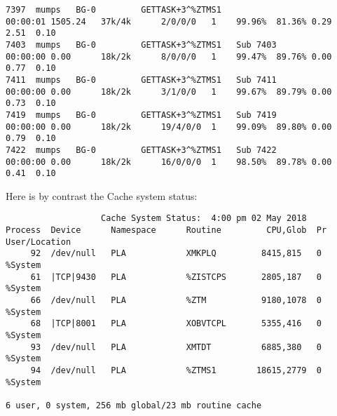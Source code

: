 \documentclass[]{article}
\begin{document}
\begin{landscape}
\begin{changemargin}{-0.25in}{-0.25in}
\begin{lstlisting}
7397  mumps   BG-0         GETTASK+3^%ZTMS1                       00:00:01 1505.24   37k/4k      2/0/0/0   1    99.96%  81.36% 0.29    2.51  0.10
7403  mumps   BG-0         GETTASK+3^%ZTMS1   Sub 7403            00:00:00 0.00      18k/2k      8/0/0/0   1    99.47%  89.76% 0.00    0.77  0.10
7411  mumps   BG-0         GETTASK+3^%ZTMS1   Sub 7411            00:00:00 0.00      18k/2k      3/1/0/0   1    99.67%  89.79% 0.00    0.73  0.10
7419  mumps   BG-0         GETTASK+3^%ZTMS1   Sub 7419            00:00:00 0.00      18k/2k      19/4/0/0  1    99.09%  89.80% 0.00    0.79  0.10
7422  mumps   BG-0         GETTASK+3^%ZTMS1   Sub 7422            00:00:00 0.00      18k/2k      16/0/0/0  1    98.50%  89.78% 0.00    0.41  0.10
\end{lstlisting}
\end{changemargin}


Here is by contrast the Cache system status:

\lstset{
	caption=Cache System Status
}
\begin{lstlisting}
                   Cache System Status:  4:00 pm 02 May 2018
Process  Device      Namespace      Routine         CPU,Glob  Pr User/Location
     92  /dev/null   PLA            XMKPLQ         8415,815   0  %System
     61  |TCP|9430   PLA            %ZISTCPS       2805,187   0  %System
     66  /dev/null   PLA            %ZTM           9180,1078  0  %System
     68  |TCP|8001   PLA            XOBVTCPL       5355,416   0  %System
     93  /dev/null   PLA            XMTDT          6885,380   0  %System
     94  /dev/null   PLA            %ZTMS1        18615,2779  0  %System

6 user, 0 system, 256 mb global/23 mb routine cache
\end{lstlisting}
\end{landscape}
\pagebreak
\end{document}
